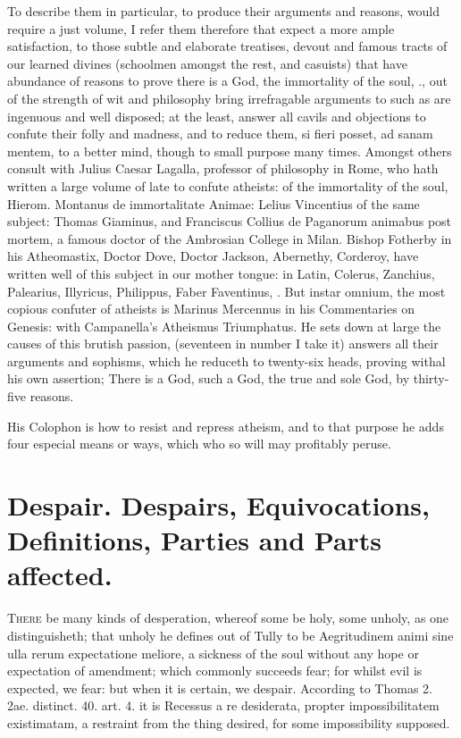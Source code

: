 {To describe them in particular, to produce their arguments and reasons,
would require a just volume, I refer them therefore that expect a more
ample satisfaction, to those subtle and elaborate treatises, devout and
famous tracts of our learned divines (schoolmen amongst the rest, and
casuists) that have abundance of reasons to prove there is a God, the
immortality of the soul, \etc{}., out of the strength of wit and philosophy
bring irrefragable arguments to such as are ingenuous and well
disposed; at the least, answer all cavils and objections to confute
their folly and madness, and to reduce them, si fieri posset, ad sanam
mentem, to a better mind, though to small purpose many times. Amongst
others consult with Julius Caesar Lagalla, professor of philosophy in
Rome, who hath written a large volume of late to confute atheists: of
the immortality of the soul, Hierom. Montanus de immortalitate Animae:
Lelius Vincentius of the same subject: Thomas Giaminus, and Franciscus
Collius de Paganorum animabus post mortem, a famous doctor of the
Ambrosian College in Milan. Bishop Fotherby in his Atheomastix, Doctor
Dove, Doctor Jackson, Abernethy, Corderoy, have written well of this
subject in our mother tongue: in Latin, Colerus, Zanchius, Palearius,
Illyricus, Philippus, Faber Faventinus, \etc{}. But instar omnium,
the most copious confuter of atheists is Marinus Mercennus in his
Commentaries on Genesis: with Campanella's Atheismus Triumphatus.
He sets down at large the causes of this brutish passion, (seventeen in
number I take it) answers all their arguments and sophisms, which he
reduceth to twenty-six heads, proving withal his own assertion; There
is a God, such a God, the true and sole God, by thirty-five reasons.

His Colophon is how to resist and repress atheism, and to that purpose
he adds four especial means or ways, which who so will may profitably
peruse.

\section[Despair]{Despair. Despairs, Equivocations, Definitions, Parties and Parts affected.}

\lettrine{T}{here} be many kinds of desperation, whereof some be holy, some unholy,
as one distinguisheth; that unholy he defines out of Tully to be
Aegritudinem animi sine ulla rerum expectatione meliore, a sickness of
the soul without any hope or expectation of amendment; which commonly
succeeds fear; for whilst evil is expected, we fear: but when it is
certain, we despair. According to Thomas 2. 2ae. distinct. 40. art. 4.
it is Recessus a re desiderata, propter impossibilitatem existimatam, a
restraint from the thing desired, for some impossibility supposed.

}

